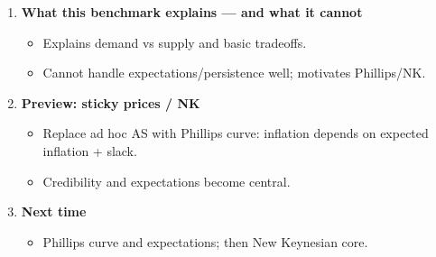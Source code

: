 \documentclass[11pt]{article}
\begin{document}
\begin{enumerate}
\item \textbf{What this benchmark explains --- and what it cannot}
\begin{itemize}
\item Explains demand vs supply and basic tradeoffs.
\item Cannot handle expectations/persistence well; motivates Phillips/NK.
\end{itemize}

\item \textbf{Preview: sticky prices / NK}
\begin{itemize}
\item Replace ad hoc AS with Phillips curve: inflation depends on expected inflation + slack.
\item Credibility and expectations become central.
\end{itemize}

\item \textbf{Next time}
\begin{itemize}
\item Phillips curve and expectations; then New Keynesian core.
\end{itemize}
\end{enumerate}
\end{document}
